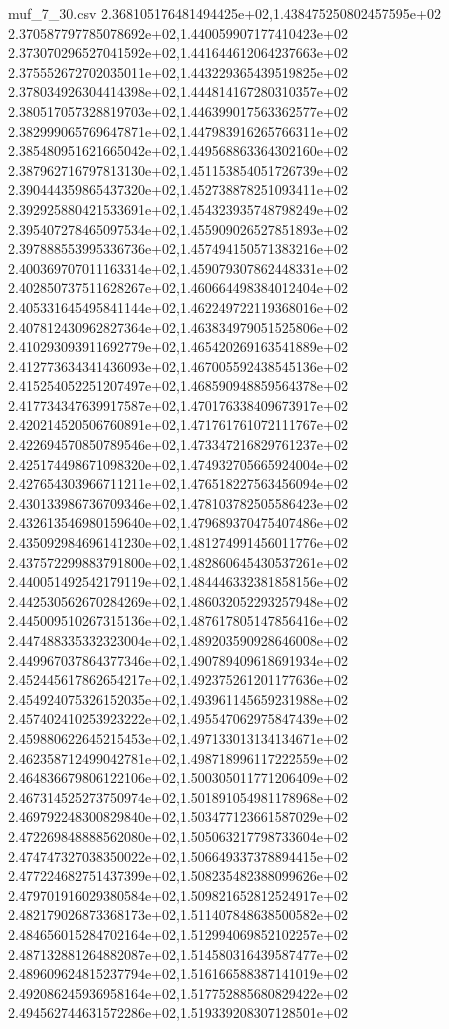 \begin{filecontents*}{muf_7_30.csv}
2.368105176481494425e+02,1.438475250802457595e+02
2.370587797785078692e+02,1.440059907177410423e+02
2.373070296527041592e+02,1.441644612064237663e+02
2.375552672702035011e+02,1.443229365439519825e+02
2.378034926304414398e+02,1.444814167280310357e+02
2.380517057328819703e+02,1.446399017563362577e+02
2.382999065769647871e+02,1.447983916265766311e+02
2.385480951621665042e+02,1.449568863364302160e+02
2.387962716797813130e+02,1.451153854051726739e+02
2.390444359865437320e+02,1.452738878251093411e+02
2.392925880421533691e+02,1.454323935748798249e+02
2.395407278465097534e+02,1.455909026527851893e+02
2.397888553995336736e+02,1.457494150571383216e+02
2.400369707011163314e+02,1.459079307862448331e+02
2.402850737511628267e+02,1.460664498384012404e+02
2.405331645495841144e+02,1.462249722119368016e+02
2.407812430962827364e+02,1.463834979051525806e+02
2.410293093911692779e+02,1.465420269163541889e+02
2.412773634341436093e+02,1.467005592438545136e+02
2.415254052251207497e+02,1.468590948859564378e+02
2.417734347639917587e+02,1.470176338409673917e+02
2.420214520506760891e+02,1.471761761072111767e+02
2.422694570850789546e+02,1.473347216829761237e+02
2.425174498671098320e+02,1.474932705665924004e+02
2.427654303966711211e+02,1.476518227563456094e+02
2.430133986736709346e+02,1.478103782505586423e+02
2.432613546980159640e+02,1.479689370475407486e+02
2.435092984696141230e+02,1.481274991456011776e+02
2.437572299883791800e+02,1.482860645430537261e+02
2.440051492542179119e+02,1.484446332381858156e+02
2.442530562670284269e+02,1.486032052293257948e+02
2.445009510267315136e+02,1.487617805147856416e+02
2.447488335332323004e+02,1.489203590928646008e+02
2.449967037864377346e+02,1.490789409618691934e+02
2.452445617862654217e+02,1.492375261201177636e+02
2.454924075326152035e+02,1.493961145659231988e+02
2.457402410253923222e+02,1.495547062975847439e+02
2.459880622645215453e+02,1.497133013134134671e+02
2.462358712499042781e+02,1.498718996117222559e+02
2.464836679806122106e+02,1.500305011771206409e+02
2.467314525273750974e+02,1.501891054981178968e+02
2.469792248300829840e+02,1.503477123661587029e+02
2.472269848888562080e+02,1.505063217798733604e+02
2.474747327038350022e+02,1.506649337378894415e+02
2.477224682751437399e+02,1.508235482388099626e+02
2.479701916029380584e+02,1.509821652812524917e+02
2.482179026873368173e+02,1.511407848638500582e+02
2.484656015284702164e+02,1.512994069852102257e+02
2.487132881264882087e+02,1.514580316439587477e+02
2.489609624815237794e+02,1.516166588387141019e+02
2.492086245936958164e+02,1.517752885680829422e+02
2.494562744631572286e+02,1.519339208307128501e+02

\end{filecontents*}

